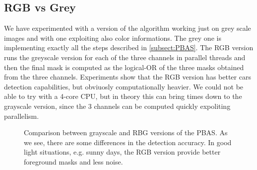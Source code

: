 \subsection*{RGB vs Grey}
We have experimented with a version of the algorithm working just on grey scale images and with one exploiting also color informations. The grey one is implementing exactly all the steps described in \ref{subsect:PBAS}. The RGB version runs the greyscale version for each of the three channels in parallel threads and then the final mask is computed as the logical-OR of the three masks obtained from the three channels.
Experiments show that the RGB version has better cars detection capabilities, but obviuosly computationally heavier. We could not be able to try with a 4-core CPU, but in theory this can bring times down to the grayscale version, since the 3 channels can be computed quickly expoliting parallelism.

\begin{figure}[!t]
    \centering
    \newline
    \newline
    \caption{Comparison between grayscale and RBG versions of the PBAS. As we see, there are some differences in the detection accuracy. In good light situations, e.g. sunny days, the RGB version provide better foreground masks and less noise.}
\end{figure}

